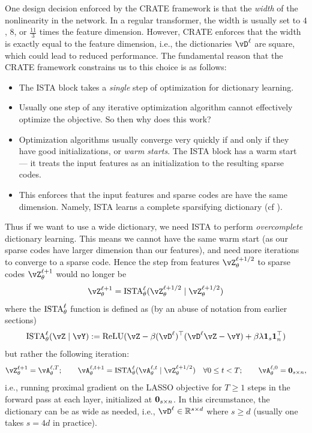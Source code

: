 \documentclass[../../book-main.tex]{subfiles}
\begin{document}
One design decision enforced by the CRATE framework is that the \textit{width} of the nonlinearity in the network. In a regular transformer, the width is usually set to \(4\), \(8\), or \(\frac{11}{3}\) times the feature dimension. However, CRATE enforces that the width is exactly equal to the feature dimension, i.e., the dictionaries \(\vD^{\ell}\) are square, which could lead to reduced performance. The fundamental reason that the CRATE framework constrains us to this choice is as follows:
\begin{itemize}
    \item The ISTA block takes a \textit{single} step of optimization for dictionary learning.
    \item Usually one step of any iterative optimization algorithm cannot effectively optimize the objective. So then why does this work?
    \item Optimization algorithms usually converge very quickly if and only if they have good initializations, or \textit{warm starts}. The ISTA block has a warm start --- it treats the input features as an initialization to the resulting sparse codes.
    \item This enforces that the input features and sparse codes are have the same dimension. Namely, ISTA learns a complete sparsifying dictionary (cf ).
\end{itemize}
Thus if we want to use a wide dictionary, we need ISTA to perform \textit{overcomplete} dictionary learning. This means we cannot have the same warm start (as our sparse codes have larger dimension than our features), and need more iterations to converge to a sparse code. Hence the step from features \(\vZ_{\theta}^{\ell + 1/2}\) to sparse codes \(\vZ_{\theta}^{\ell + 1}\) would no longer be 
\begin{equation}
    \vZ_{\theta}^{\ell + 1} = \ISTA_{\theta}^{\ell}(\vZ_{\theta}^{\ell + 1/2} \mid \vZ_{\theta}^{\ell + 1/2})
\end{equation}
where the \(\operatorname{ISTA}_{\theta}^{\ell}\) function is defined as (by an abuse of notation from earlier sections)
\begin{equation}
    \ISTA_{\theta}^{\ell}(\vZ \mid \vY) := \ReLU(\vZ - \beta (\vD^{\ell})^{\top}(\vD^{\ell}\vZ - \vY) + \beta \lambda \vone_{s}\vone_{n}^{\top})
\end{equation}
but rather the following iteration:
\begin{equation}
    \vZ_{\theta}^{\ell + 1} = \vA_{\theta}^{\ell, T}; \qquad \vA_{\theta}^{\ell, t + 1} = \ISTA_{\theta}^{\ell}(\vA_{\theta}^{\ell, t} \mid \vZ_{\theta}^{\ell + 1/2}) \quad \forall 0 \leq t < T; \qquad \vA_{\theta}^{\ell, 0} = \vzero_{s \times n},
\end{equation}
i.e., running proximal gradient on the LASSO objective for \(T \geq 1\) steps in the forward pass at each layer, initialized at \(\bm{0}_{s \times n}\). In this circumstance, the dictionary can be as wide as needed, i.e., \(\vD^{\ell} \in \R^{s \times d}\) where \(s \geq d\) (usually one takes \(s = 4d\) in practice). 
\end{document}
